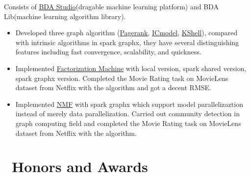 \documentclass{resume}
\begin{document}
Consists of \href{http://bda.space:18080}{BDA Studio}(dragable machine learning platform) and BDA Lib(machine learning algorithm library).
\begin{itemize}
  \item Developed three graph algorithm (\href{http://bda.space:18080/BDAStudioMonitor.html?job=0000001-160229111630187-oozie-oozi-W}{Pagerank}, \href{http://bda.space:18080/BDAStudioMonitor.html?job=0000015-160229111630187-oozie-oozi-W}{ICmodel}, \href{http://bda.space:18080/BDAStudioMonitor.html?job=0000206-151222123224608-oozie-oozi-W}{KShell}), compared with intrinsic algorithms in spark graphx, they have several distinguishing features including fast convergence, scalability, and quickness.
  \item Implemented \href{http://bda.space:18080/BDAStudioMonitor.html?job=0000009-160229111630187-oozie-oozi-W}{Factorization Machine}  with local version, spark shared version, spark graphx version. Completed the Movie Rating task on MovieLens dataset from Netflix  with the algorithm and got a decent RMSE.
  \item Implemented \href{http://bda.space:18080/BDAStudioMonitor.html?job=0000009-160229111630187-oozie-oozi-W}{NMF}  with spark graphx which support model parallelizaztion instead of merely data parallelization. Carried out community detection in graph computing field and completed the Movie Rating task on MovieLens dataset from Netflix with the algorithm.
  \end{itemize}




\section{\faHeartO\ Honors and Awards}
\end{document}
